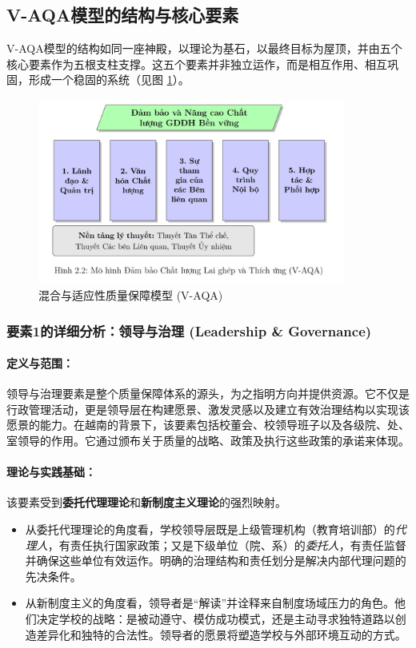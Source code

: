 \subsection{V-AQA模型的结构与核心要素}
\label{subsec:cau_truc_V-AQA}

V-AQA模型的结构如同一座神殿，以理论为基石，以最终目标为屋顶，并由五个核心要素作为五根支柱支撑。这五个要素并非独立运作，而是相互作用、相互巩固，形成一个稳固的系统（见图 \ref{fig:v-aqa-model-detailed}）。

\begin{figure}[h!]
    \centering
    \includegraphics[width=0.9\textwidth]{image/mo_hinh_V-AQA.jpg}
    \caption{混合与适应性质量保障模型 (V-AQA)}
    \label{fig:v-aqa-model-detailed}
\end{figure}

\subsubsection{要素1的详细分析：领导与治理 (Leadership \& Governance)}
\label{subsubsec:thanh_to_1}

\paragraph{定义与范围：}
领导与治理要素是整个质量保障体系的源头，为之指明方向并提供资源。它不仅是行政管理活动，更是领导层在构建愿景、激发灵感以及建立有效治理结构以实现该愿景的能力。在越南的背景下，该要素包括校董会、校领导班子以及各级院、处、室领导的作用。它通过颁布关于质量的战略、政策及执行这些政策的承诺来体现。

\paragraph{理论与实践基础：}
该要素受到\textbf{委托代理理论}和\textbf{新制度主义理论}的强烈映射。
\begin{itemize}
    \item 从委托代理理论的角度看，学校领导层既是上级管理机构（教育培训部）的\textit{代理人}，有责任执行国家政策；又是下级单位（院、系）的\textit{委托人}，有责任监督并确保这些单位有效运作。明确的治理结构和责任划分是解决内部代理问题的先决条件。
    \item 从新制度主义的角度看，领导者是“解读”并诠释来自制度场域压力的角色。他们决定学校的战略：是被动遵守、模仿成功模式，还是主动寻求独特道路以创造差异化和独特的合法性。领导者的愿景将塑造学校与外部环境互动的方式。
\end{itemize}

